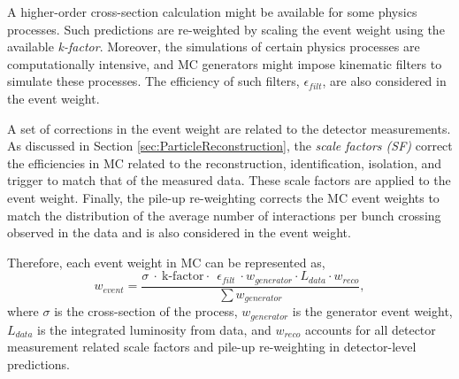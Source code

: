 A higher-order cross-section calculation might be available for some physics processes. Such predictions are re-weighted by scaling the event weight using the available \textit{k-factor}. Moreover, the simulations of certain physics processes are computationally intensive, and MC generators might impose kinematic filters to simulate these processes. The efficiency of such filters, $\epsilon_{filt}$, are also considered in the event weight. 

A set of corrections in the event weight are related to the detector measurements. As discussed in Section \ref{sec:ParticleReconstruction}, the \textit{scale factors (SF)} correct the efficiencies in MC related to the reconstruction, identification, isolation, and trigger to match that of the measured data. These scale factors are applied to the event weight. Finally, the pile-up re-weighting corrects the MC event weights to match the distribution of the average number of interactions per bunch crossing observed in the data and is also considered in the event weight.

Therefore, each event weight in MC can be represented as, 
\begin{equation}
w_{event} = \frac{\sigma~\cdot~\text{k-factor}\cdot~~\epsilon_{filt}~\cdot w_{generator} \cdot {L_{data} \cdot w_{reco}}}{\sum{w_{generator}}},
\label{eqn:EventWeight}
\end{equation}
where $\sigma$ is the cross-section of the process, $w_{generator}$ is the generator event weight, $L_{data}$ is the integrated luminosity from data, and $w_{reco}$ accounts for all detector measurement related scale factors and pile-up re-weighting in detector-level predictions.